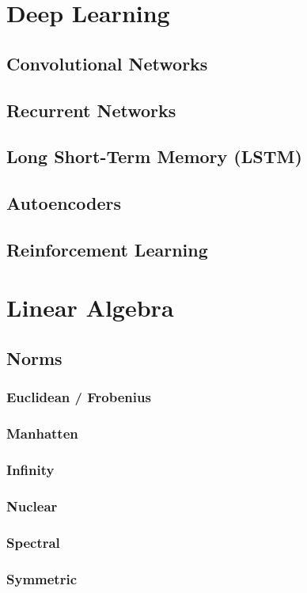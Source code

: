 \documentclass[11pt]{article}
\begin{document}
\section{Deep Learning}
\subsection{Convolutional Networks}
\subsection{Recurrent Networks}
\subsection{Long Short-Term Memory (LSTM)}
\subsection{Autoencoders}
\subsection{Reinforcement Learning}

\section{Linear Algebra}
\subsection{Norms}
\subsubsection{Euclidean / Frobenius}
\subsubsection{Manhatten}
\subsubsection{Infinity}
\subsubsection{Nuclear}
\subsubsection{Spectral}
\subsubsection{Symmetric}
\end{document}

